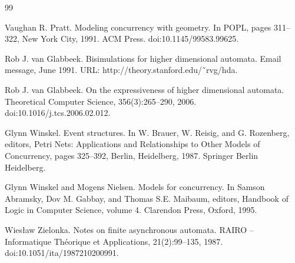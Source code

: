\begin{thebibliography}{99}
\par\noindent    Vaughan R. Pratt.  Modeling concurrency with geometry.  In POPL, pages 311–322, New York City, 1991. ACM Press.  doi:10.1145/99583.99625.  

\par\noindent    Rob J. van Glabbeek.  Bisimulations for higher dimensional automata.  Email message, June 1991.  URL: http://theory.stanford.edu/˜rvg/hda.  

\par\noindent    Rob J. van Glabbeek.  On the expressiveness of higher dimensional automata.  Theoretical Computer Science, 356(3):265–290, 2006.  doi:10.1016/j.tcs.2006.02.012.  

\par\noindent    Glynn Winskel.  Event structures.  In W. Brauer, W. Reisig, and G. Rozenberg, editors, Petri Nets: Applications and Relationships to Other Models of Concurrency, pages 325–392, Berlin, Heidelberg, 1987. Springer Berlin Heidelberg.  

\par\noindent    Glynn Winskel and Mogens Nielsen.  Models for concurrency.  In Samson Abramsky, Dov M. Gabbay, and Thomas S.E. Maibaum, editors, Handbook of Logic in Computer Science, volume 4. Clarendon Press, Oxford, 1995.  

\par\noindent    Wiesław Zielonka.  Notes on finite asynchronous automata.  RAIRO – Informatique Théorique et Applications, 21(2):99–135, 1987.  doi:10.1051/ita/1987210200991.  

\end{thebibliography}
